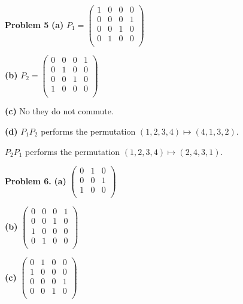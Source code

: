\documentclass[oneside,12pt]{amsart}
\begin{document}
\bigskip

\textbf{Problem 5}
\textbf{(a)}
$P_1=
\begin{pmatrix}
1 & 0 & 0 & 0\\
0 & 0 & 0 & 1\\
0 & 0 & 1 & 0\\
0 & 1 & 0 & 0\\
\end{pmatrix}
$

\bigskip

\textbf{(b)}
$P_2=
\begin{pmatrix}
0 & 0 & 0 & 1\\
0 & 1 & 0 & 0\\
0 & 0 & 1 & 0\\
1 & 0 & 0 & 0\\
\end{pmatrix}
$

\bigskip

\textbf{(c)} No they do not commute.

\bigskip

\textbf{(d)} $P_1 P_2$ performs the permutation $(1,2,3,4) \mapsto (4,1,3,2)$.

\bigskip

$P_2 P_1$ performs the permutation $(1,2,3,4) \mapsto (2,4,3,1)$.

\bigskip

\textbf{Problem 6.}
\textbf{(a)}
$
\begin{pmatrix}
0 & 1 & 0\\
0 & 0 & 1\\
1 & 0 & 0\\
\end{pmatrix}
$

\bigskip

\textbf{(b)}
$
\begin{pmatrix}
0 & 0 & 0 & 1\\
0 & 0 & 1 & 0\\
1 & 0 & 0 & 0\\
0 & 1 & 0 & 0\\
\end{pmatrix}
$

\bigskip

\textbf{(c)}
$
\begin{pmatrix}
0 & 1 & 0 & 0\\
1 & 0 & 0 & 0\\
0 & 0 & 0 & 1\\
0 & 0 & 1 & 0\\
\end{pmatrix}
$
\end{document}
